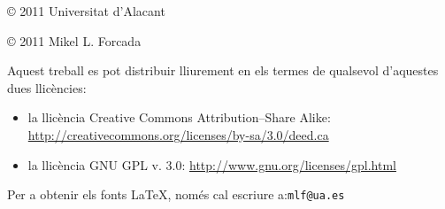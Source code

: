 \documentclass{beamer}
\begin{document}
\begin{frame}

  © 2011 Universitat d'Alacant

  © 2011 Mikel L. Forcada

Aquest treball es pot distribuir lliurement en els termes de qualsevol d'aquestes dues llicències:
\begin{itemize}
\item la llicència Creative Commons
  Attribution--Share Alike:
  \url{http://creativecommons.org/licenses/by-sa/3.0/deed.ca} 
\item la llicència GNU GPL v. 3.0: \url{http://www.gnu.org/licenses/gpl.html}
\end{itemize}
Per a obtenir els fonts \LaTeX{}, només cal escriure a:\texttt{mlf@ua.es}


\end{frame}
\end{document}
